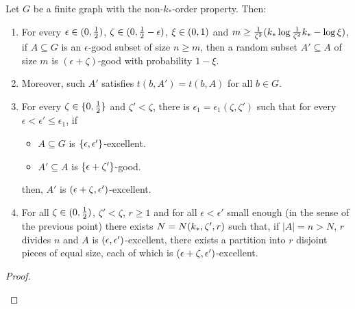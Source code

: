     \begin{lemma}[Claim 5.13] \label{lem:equitable_partition_of_excellent_parts}
        Let $G$ be a finite graph with the non-$k_{*}$-order property.
        Then:
        \begin{enumerate}[label=(\alph*), ref=\alph*]
            \item \label{itm:equitable_partition_of_excellent_parts.1} For every $\epsilon \in ( 0, \frac{1}{2} )$,
                $\zeta \in ( 0, \frac{1}{2} - \epsilon )$, $\xi \in ( 0, 1 )$ and
                $m \geq \frac{1}{\zeta^2}( k_* \log{\frac{1}{\zeta^2}k_*} - \log{\xi} )$,
                if $A \subseteq G$ is an $\epsilon$-good subset of size $n \geq m$,
                then a random subset $A' \subseteq A$ of size $m$ is $(\epsilon + \zeta)$-good with probability $1-\xi$.
            \item \label{itm:equitable_partition_of_excellent_parts.1*} Moreover, such $A'$ satisfies $t(b, A') = t(b, A)$ for all $b \in G$.
            \item \label{itm:equitable_partition_of_excellent_parts.2} For every $\zeta \in \{ 0, \frac{1}{2} \}$ and $\zeta' < \zeta$, there is
                $\epsilon_1 = \epsilon_1(\zeta, \zeta')$ such that for every $\epsilon < \epsilon' \leq \epsilon_1$, if
                \begin{itemize}
                    \item $A \subseteq G$ is $\{ \epsilon, \epsilon' \}$-excellent.
                    \item $A' \subseteq A$ is $\{ \epsilon + \zeta' \}$-good.
                \end{itemize}
                then, $A'$ is $( \epsilon + \zeta, \epsilon' )$-excellent.
            \item \label{itm:equitable_partition_of_excellent_parts.3} For all $\zeta \in ( 0, \frac{1}{2} )$, $\zeta' < \zeta$, $r \geq 1$ and for all
                $\epsilon < \epsilon'$ small enough (in the sense of the previous point) there exists
                $N = N( k_{*}, \zeta', r )$ such that, if $|A| = n > N$, $r$ divides $n$ and $A$ is
                $( \epsilon, \epsilon' )$-excellent, there exists a partition into $r$ disjoint pieces of equal
                size, each of which is $( \epsilon + \zeta, \epsilon' )$-excellent.
        \end{enumerate}
        \begin{proof}
        \begin{enumerate}[label=(\alph*), ref=\alph*]

\end{enumerate}
\end{proof}
\end{lemma}
